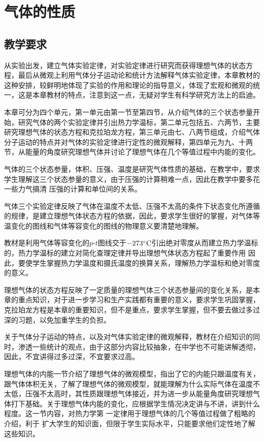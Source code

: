 
\chapter{气体的性质}
\section{教学要求}
从实验出发，建立气体实验定律，对实验定律进行研究而获得理想气体的状态方程，最后从微观上利用气体分子运动论和统计方法解释气体实验定律，本章教材的这种安排，较鲜明地体现了实验的作用和理论的指导意义，体现了宏观和微观的统一，这是本章教材的特点，注意到这一点，无疑对学生有科学研究方法上的启迪。

本章可分为四个单元，第一单元由第一节至第四节，从介绍气体的三个状态参量开始，研究气体的两个实验定律并引出热力学温标，第二单元包括五、六两节，主要研究理想气体的状态方程和克拉珀龙方程，第三单元由七、八两节组成，介绍气体分子运动的特点并对气体的实验定律进行定性的微观解释，第四单元为九、十两节，从能量的角度研究理想气体并讨论了理想气体在几个等值过程中内能的变化。

气体的三个状态参量，体积、压强、温度是研究气体性质的基础，在教学中，要求学生理解这三个状态参量的意义，由于压强的计算稍难一点，因此在教学中要多花一些力气搞清
压强的计算和单位间的关系。

气体三个实验定律反映了气体在温度不太低、压强不太高的条件下状态变化所遵循的规律，是建立理想气体状态方程的依据，因此，要求学生很好的掌握，对气体等温变化的图线和气体等容变化的图线的物理意义要清楚地理解。

教材是利用气体等容变化的$p$-$t$图线交于${\rm -273^{\circ}C}$引出绝对零度从而建立热力学温标的，热力学温标的建立对简化查理定律并导出理想气体状态方程起了重要作用 因此，要使学生掌握热力学温度和摄氏温度的换算关系，理解热力学温标和绝对零度的意义。

理想气体的状态方程反映了一定质量的理想气体三个状态参量间的变化关系，是本章的重点知识，对于进一步学习和生产实践都有重要的意义，要求学生巩固掌握，克拉珀龙方程是本章的重要知识，但不是重点，要求学生掌握，但不要去做过多过深的习题，以免加重学生的负担。

关于气体分子运动的特点，以及对气体实验定律的微观解释，教材在介绍知识的同时，渗透一些统计的观点，由于这部分内容比较抽象，在中学也不可能讲解透彻，因此，不宜讲得过多过深，不宜要求过高。

理想气体的内能一节介绍了理想气体的微观模型，指出了它的内能只跟温度有关，跟气体体积无关，了解了理想气体的微观模型，就能理解为什么实际气体在温度不太低，压强不太高时，其性质跟理想气体接近，并为进一步从能量角度研究理想气体打下基础。关于理想气体内能的变化，应根据学生情况决定讲与不讲，讲到什么程度。这一节内容，对热力学第
一定律用于理想气体的几个等值过程做了粗略的介绍，利于
扩大学生的知识面，但限于学生实际水平，只能要求他们定性地了解这些知识。

